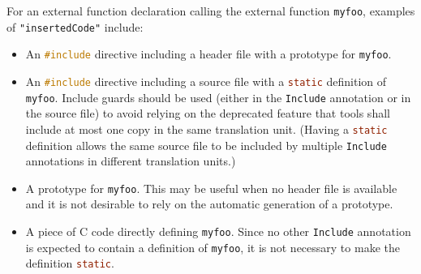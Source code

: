 \begin{annotationdefinition}[Include]
\begin{semantics}
\begin{nonnormative}
For an external function declaration calling the external function \lstinline[language=C]!myfoo!, examples of \lstinline!"insertedCode"! include:
\begin{itemize}
\item
  An \lstinline[language=C]!#include! directive including a header file with a prototype for \lstinline[language=C]!myfoo!.
\item
  An \lstinline[language=C]!#include! directive including a source file with a \lstinline[language=C]!static! definition of \lstinline[language=C]!myfoo!.
  Include guards should be used (either in the \lstinline!Include! annotation or in the source file) to avoid relying on the deprecated feature that tools shall include at most one copy in the same translation unit.
  (Having a \lstinline[language=C]!static! definition allows the same source file to be included by multiple \lstinline!Include! annotations in different translation units.)
\item
  A prototype for \lstinline[language=C]!myfoo!.
  This may be useful when no header file is available and it is not desirable to rely on the automatic generation of a prototype.
\item
  A piece of C code directly defining \lstinline[language=C]!myfoo!.
  Since no other \lstinline!Include! annotation is expected to contain a definition of \lstinline[language=C]!myfoo!, it is not necessary to make the definition \lstinline[language=C]!static!.
\end{itemize}
\end{nonnormative}
\end{semantics}
\end{annotationdefinition}


